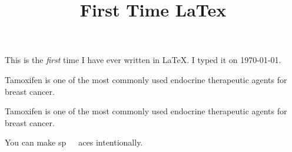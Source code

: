\documentclass{article}
\title{First Time LaTex}
\begin{document}
This is the \emph{first} time I have ever written in \LaTeX. I typed it on \today.

Tamoxifen is one of the most commonly used endocrine therapeutic agents for breast cancer.

\noindent Tamoxifen is one of the most commonly used endocrine therapeutic agents for breast cancer.

You can make sp~~~aces intentionally.
\end{document}
